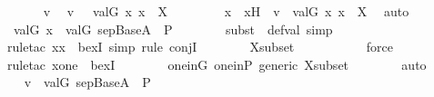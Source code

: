 \begin{isabellebody}
\ \ \ \ \isamarkupfalse%
\ v\ \isamarkupfalse%
\ {\isachardoublequoteopen}v\ {\isasymin}\ {\isacharbraceleft}{\kern0pt}\ val{\isacharparenleft}{\kern0pt}G{\isacharcomma}{\kern0pt}\ x{\isacharparenright}{\kern0pt}{\isachardot}{\kern0pt}\ x\ {\isasymin}\ X\ {\isacharbraceright}{\kern0pt}{\isachardoublequoteclose}\isanewline
\ \ \ \ \isamarkupfalse%
\ \isamarkupfalse%
\ x\ \ xH\ {\isacharcolon}{\kern0pt}\ {\isachardoublequoteopen}v\ {\isacharequal}{\kern0pt}\ val{\isacharparenleft}{\kern0pt}G{\isacharcomma}{\kern0pt}\ x{\isacharparenright}{\kern0pt}{\isachardoublequoteclose}\ {\isachardoublequoteopen}x\ {\isasymin}\ X{\isachardoublequoteclose}\ \isamarkupfalse%
\ auto\ \isanewline
\ \ \ \ \isamarkupfalse%
\ \isamarkupfalse%
\ {\isachardoublequoteopen}val{\isacharparenleft}{\kern0pt}G{\isacharcomma}{\kern0pt}\ x{\isacharparenright}{\kern0pt}\ {\isasymin}\ val{\isacharparenleft}{\kern0pt}G{\isacharcomma}{\kern0pt}\ sep{\isacharunderscore}{\kern0pt}Base{\isacharparenleft}{\kern0pt}A{\isacharparenright}{\kern0pt}\ {\isasymtimes}\ P{\isacharparenright}{\kern0pt}{\isachardoublequoteclose}\ \isanewline
\ \ \ \ \ \ \isamarkupfalse%
{\isacharparenleft}{\kern0pt}subst\ {\isacharparenleft}{\kern0pt}{}{\isacharparenright}{\kern0pt}\ def{\isacharunderscore}{\kern0pt}val{\isacharcomma}{\kern0pt}\ simp{\isacharparenright}{\kern0pt}\isanewline
\ \ \ \ \ \ \isamarkupfalse%
{\isacharparenleft}{\kern0pt}rule{\isacharunderscore}{\kern0pt}tac\ x{\isacharequal}{\kern0pt}x\ \ bexI{\isacharcomma}{\kern0pt}\ simp{\isacharcomma}{\kern0pt}\ rule\ conjI{\isacharparenright}{\kern0pt}\isanewline
\ \ \ \ \ \ \isamarkupfalse%
\ Xsubset\ \isanewline
\ \ \ \ \ \ \ \ \isamarkupfalse%
\ force\isanewline
\ \ \ \ \ \ \ \isamarkupfalse%
{\isacharparenleft}{\kern0pt}rule{\isacharunderscore}{\kern0pt}tac\ x{\isacharequal}{\kern0pt}one\ \ bexI{\isacharparenright}{\kern0pt}\isanewline
\ \ \ \ \ \ \isamarkupfalse%
\ one{\isacharunderscore}{\kern0pt}in{\isacharunderscore}{\kern0pt}G\ one{\isacharunderscore}{\kern0pt}in{\isacharunderscore}{\kern0pt}P\ generic\ Xsubset\isanewline
\ \ \ \ \ \ \isamarkupfalse%
\ auto\isanewline
\ \ \ \ \isamarkupfalse%
\ \isamarkupfalse%
\ {\isachardoublequoteopen}v\ {\isasymin}\ val{\isacharparenleft}{\kern0pt}G{\isacharcomma}{\kern0pt}\ sep{\isacharunderscore}{\kern0pt}Base{\isacharparenleft}{\kern0pt}A{\isacharparenright}{\kern0pt}\ {\isasymtimes}\ P{\isacharparenright}{\kern0pt}{\isachardoublequoteclose}\ \isanewline

\end{isabellebody}
